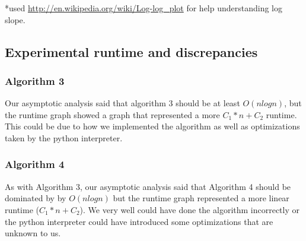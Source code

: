 \documentclass[letterpaper,10pt,titlepage]{article}
\begin{document}
*used \url{http://en.wikipedia.org/wiki/Log-log_plot} for help understanding log slope.

\subsection{Experimental runtime and discrepancies}
\subsubsection{Algorithm 3}
Our asymptotic analysis said that algorithm 3 should be at least $O(n log n)$, but the runtime graph showed a graph that represented a more $C_{1}*n+C_{2}$ runtime. This could be due to how we implemented the algorithm as well as optimizations taken by the python interpreter. 
\subsubsection{Algorithm 4}
As with Algorithm 3, our asymptotic analysis said that Algorithm 4 should be dominated by by $O(n log n)$ but the runtime graph represented a more linear runtime ($C_{1}*n+C_{2}$). We very well could have done the algorithm incorrectly or the python interpreter could have introduced some optimizations that are unknown to us.
\end{document}
